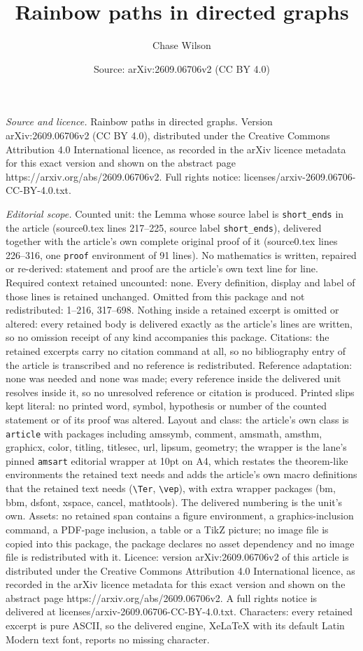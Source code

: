 \documentclass[10pt,a4paper]{amsart}
\title[Rainbow paths in directed graphs]{Rainbow paths in directed graphs}
\author{Chase Wilson}
\date{Source: arXiv:2609.06706v2 (CC BY 4.0)}
\begin{document}
\maketitle

\noindent\emph{Source and licence.} Rainbow paths in directed graphs. Version arXiv:2609.06706v2 (CC BY 4.0), distributed under the Creative Commons Attribution 4.0 International licence, as recorded in the arXiv licence metadata for this exact version and shown on the abstract page https://arxiv.org/abs/2609.06706v2. Full rights notice: licenses/arxiv-2609.06706-CC-BY-4.0.txt.\par\smallskip

\noindent\textit{Editorial scope.} Counted unit: the Lemma whose source label is \texttt{short\_ends} in the article (source0.tex lines 217--225, source label \texttt{short\_ends}), delivered together with the article's own complete original proof of it (source0.tex lines 226--316, one \texttt{proof} environment of 91 lines). No mathematics is written, repaired or re-derived: statement and proof are the article's own text line for line. Required context retained uncounted: none. Every definition, display and label of those lines is retained unchanged. Omitted from this package and not redistributed: 1--216, 317--698. Nothing inside a retained excerpt is omitted or altered: every retained body is delivered exactly as the article's lines are written, so no omission receipt of any kind accompanies this package. Citations: the retained excerpts carry no citation command at all, so no bibliography entry of the article is transcribed and no reference is redistributed. Reference adaptation: none was needed and none was made; every reference inside the delivered unit resolves inside it, so no unresolved reference or citation is produced. Printed slips kept literal: no printed word, symbol, hypothesis or number of the counted statement or of its proof was altered. Layout and class: the article's own class is \texttt{article} with packages including amssymb, comment, amsmath, amsthm, graphicx, color, titling, titlesec, url, lipsum, geometry; the wrapper is the lane's pinned \texttt{amsart} editorial wrapper at 10pt on A4, which restates the theorem-like environments the retained text needs and adds the article's own macro definitions that the retained text needs (\texttt{\textbackslash Ter}, \texttt{\textbackslash vep}), with extra wrapper packages (bm, bbm, dsfont, xspace, cancel, mathtools). The delivered numbering is the unit's own. Assets: no retained span contains a figure environment, a graphics-inclusion command, a PDF-page inclusion, a table or a TikZ picture; no image file is copied into this package, the package declares no asset dependency and no image file is redistributed with it. Licence: version arXiv:2609.06706v2 of this article is distributed under the Creative Commons Attribution 4.0 International licence, as recorded in the arXiv licence metadata for this exact version and shown on the abstract page https://arxiv.org/abs/2609.06706v2. A full rights notice is delivered at licenses/arxiv-2609.06706-CC-BY-4.0.txt. Characters: every retained excerpt is pure ASCII, so the delivered engine, XeLaTeX with its default Latin Modern text font, reports no missing character.
\end{document}
